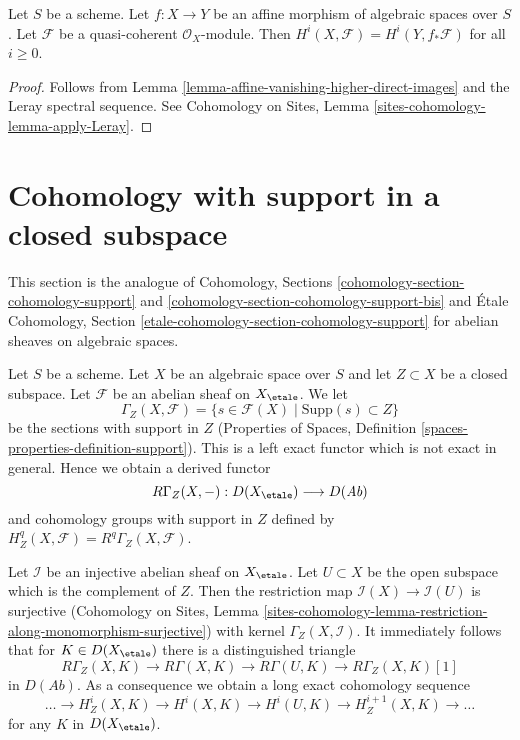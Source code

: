 \begin{lemma}
\label{lemma-relative-affine-cohomology}
Let $S$ be a scheme. Let $f : X \to Y$ be an affine
morphism of algebraic spaces over $S$.
Let $\mathcal{F}$ be a quasi-coherent $\mathcal{O}_X$-module.
Then $H^i(X, \mathcal{F}) = H^i(Y, f_*\mathcal{F})$ for all $i \geq 0$.
\end{lemma}

\begin{proof}
Follows from Lemma \ref{lemma-affine-vanishing-higher-direct-images}
and the Leray spectral sequence. See
Cohomology on Sites, Lemma \ref{sites-cohomology-lemma-apply-Leray}.
\end{proof}






\section{Cohomology with support in a closed subspace}
\label{section-cohomology-support}

\noindent
This section is the analogue of Cohomology, Sections
\ref{cohomology-section-cohomology-support} and
\ref{cohomology-section-cohomology-support-bis}
and \'Etale Cohomology, Section
\ref{etale-cohomology-section-cohomology-support}
for abelian sheaves on algebraic spaces.

\medskip\noindent
Let $S$ be a scheme.
Let $X$ be an algebraic space over $S$ and let $Z \subset X$ be a closed
subspace. Let $\mathcal{F}$ be an abelian sheaf on $X_\etale$. We let
$$
\Gamma_Z(X, \mathcal{F}) =
\{s \in \mathcal{F}(X) \mid \text{Supp}(s) \subset Z\}
$$
be the sections with support in $Z$
(Properties of Spaces, Definition \ref{spaces-properties-definition-support}).
This is a left exact functor which is not exact in general.
Hence we obtain a derived functor
$$
R\Gamma_Z(X, -) : D(X_\etale) \longrightarrow D(\textit{Ab})
$$
and cohomology groups with support in $Z$ defined by
$H^q_Z(X, \mathcal{F}) = R^q\Gamma_Z(X, \mathcal{F})$.

\medskip\noindent
Let $\mathcal{I}$ be an injective abelian sheaf on $X_\etale$. Let
$U \subset X$ be the open subspace which is the complement of $Z$.
Then the restriction map $\mathcal{I}(X) \to \mathcal{I}(U)$ is surjective
(Cohomology on Sites, Lemma
\ref{sites-cohomology-lemma-restriction-along-monomorphism-surjective})
with kernel $\Gamma_Z(X, \mathcal{I})$. It immediately follows that
for $K \in D(X_\etale)$ there is a distinguished triangle
$$
R\Gamma_Z(X, K) \to R\Gamma(X, K) \to R\Gamma(U, K) \to R\Gamma_Z(X, K)[1]
$$
in $D(\textit{Ab})$. As a consequence we obtain a long exact cohomology
sequence
$$
\ldots \to H^i_Z(X, K) \to H^i(X, K) \to H^i(U, K) \to
H^{i + 1}_Z(X, K) \to \ldots
$$
for any $K$ in $D(X_\etale)$.

